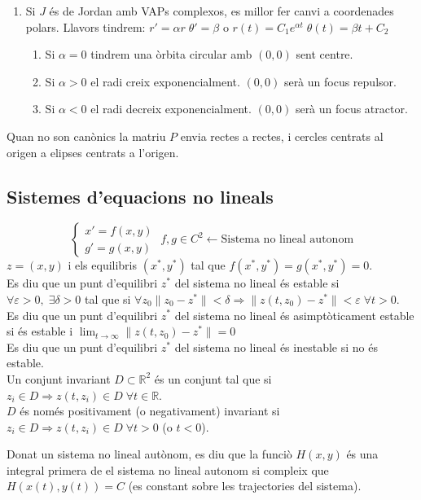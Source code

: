 \documentclass[../main.tex]{subfiles}
\begin{document}
\begin{enumerate}
	\item Si $J$ és de Jordan amb VAPs complexos, es millor fer canvi a coordenades polars. Llavors tindrem: $r' = \alpha r\;\theta' = \beta$ o $r(t) = C_1e^{\alpha t}\;\theta(t) = \beta t + C_2$
	\begin{enumerate}
		\item Si $\alpha = 0$ tindrem una òrbita circular amb $(0,0)$ sent centre.
		\item Si $\alpha > 0$ el radi creix exponencialment. $(0,0)$ serà un focus repulsor.
		\item Si $\alpha < 0$ el radi decreix exponencialment. $(0,0)$ serà un focus atractor.
	\end{enumerate}
\end{enumerate}
Quan no son canònics la matriu $P$ envia rectes a rectes, i cercles centrats al origen a elipses centrats a l'origen.
\subsection{Sistemes d'equacions no lineals}
\begin{displaymath}
	\begin{cases}
		x' = f(x, y)\\
		g' = g(x, y)
	\end{cases}\; f, g \in C^2 \leftarrow \text{Sistema no lineal autonom}
\end{displaymath}
$z = (x,y)$ i els equilibris $(x^*, y^*)$ tal que $f(x^*, y^*) = g(x^*, y^*) = 0$.\\
Es diu que un punt d'equilibri $z^*$ del sistema no lineal és estable si $\forall \varepsilon > 0,\;\exists \delta > 0$ tal que si $\forall z_0 \|z_0 - z^*\| < \delta \Rightarrow \|z(t, z_0) - z^*\| < \varepsilon\;\forall t > 0$.\\
Es diu que un punt d'equilibri $z^*$ del sistema no lineal és asimptòticament estable si és estable i $\lim_{t \to \infty} \|z(t, z_0)-z^*\| = 0$\\
Es diu que un punt d'equilibri $z^*$ del sistema no lineal és inestable si no és estable.\\
Un conjunt invariant $D \subset \mathbb{R}^2$ és un conjunt tal que si $z_i \in D \Rightarrow z(t, z_i) \in D\;\forall t \in \mathbb{R}$.\\
$D$ és només positivament (o negativament) invariant si $z_i \in D \Rightarrow z(t, z_i) \in D\;\forall t > 0$ (o $t < 0$).\\
\begin{definicio}
	Donat un sistema no lineal autònom, es diu que la funciò $H(x,y)$ és una integral primera de el sistema no lineal autonom si compleix que $H(x(t), y(t))=C$ (es constant sobre les trajectories del sistema).
\end{definicio}
\end{document}
